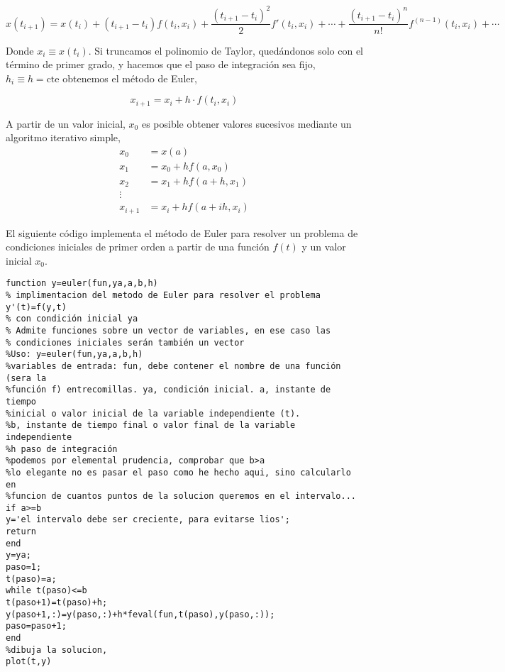 \begin{equation*}
x(t_{i+1})=x(t_i)+(t_{i+1}-t_{i})f(t_i,x_i)+\frac{(t_{i+1}-t_{i})^2}{2}f'(t_i,x_i)+\cdots+ \frac{(t_{i+1}-t_i)^n}{n!}f^{(n-1)}(t_i,x_i)+\cdots
\end{equation*}

Donde $x_i\equiv x(t_i)$. Si truncamos el polinomio de Taylor, quedándonos solo con el término de primer grado, y hacemos que el paso de integración sea fijo, $h_i\equiv h=\mathrm{cte}$ obtenemos el método de Euler,

\begin{equation*}
x_{i+1}=x_i+h\cdot f(t_i,x_i)
\end{equation*}

A partir de un valor inicial, $x_0$ es posible obtener valores sucesivos mediante un algoritmo iterativo simple,
\begin{align*}
x_0&=x(a)\\
x_1&=x_0+hf(a,x_0)\\
x_2&=x_1+hf(a+h,x_1)\\
\vdots \\
x_{i+1}&=x_i+hf(a+ih,x_i)
\end{align*}

El siguiente código implementa el método de Euler para resolver un problema de condiciones iniciales de primer orden a partir de una función $f(t)$ y un valor inicial $x_0$.

\begin{lstlisting}
function y=euler(fun,ya,a,b,h)
% implimentacion del metodo de Euler para resolver el problema y'(t)=f(y,t)
% con condición inicial ya
% Admite funciones sobre un vector de variables, en ese caso las
% condiciones iniciales serán también un vector
%Uso: y=euler(fun,ya,a,b,h)
%variables de entrada: fun, debe contener el nombre de una función (sera la
%función f) entrecomillas. ya, condición inicial. a, instante de tiempo 
%inicial o valor inicial de la variable independiente (t). 
%b, instante de tiempo final o valor final de la variable independiente
%h paso de integración
%podemos por elemental prudencia, comprobar que b>a
%lo elegante no es pasar el paso como he hecho aqui, sino calcularlo en
%funcion de cuantos puntos de la solucion queremos en el intervalo...
if a>=b
y='el intervalo debe ser creciente, para evitarse lios';
return
end
y=ya;
paso=1;
t(paso)=a;
while t(paso)<=b
t(paso+1)=t(paso)+h;
y(paso+1,:)=y(paso,:)+h*feval(fun,t(paso),y(paso,:));
paso=paso+1;
end
%dibuja la solucion,
plot(t,y)

\end{lstlisting}

